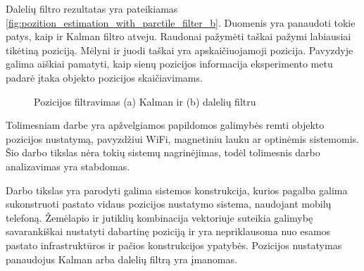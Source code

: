 Dalelių filtro rezultatas yra pateikiamas \ref{fig:pozition_estimation_with_parctile_filter_b}. Duomenis yra panaudoti tokie patys, kaip ir Kalman filtro atveju. Raudonai pažymėti taškai pažymi labiausiai tikėtiną poziciją. Mėlyni ir juodi taškai yra apskaičiuojamoji pozicija. Pavyzdyje galima aiškiai pamatyti, kaip sienų pozicijos informacija eksperimento metu padarė įtaka objekto pozicijos skaičiavimams.

\begin{figure}[H]
    \label{fig:pozition_estimation_with_parctile_filter}
    \centering
    \caption{Pozicijos filtravimas (a) Kalman ir (b) dalelių filtru \cite{willemsenconcept}}
\end{figure}


Tolimesniam darbe yra apžvelgiamos papildomos galimybės remti objekto pozicijos nustatymą, pavyzdžiui WiFi, magnetiniu lauku ar optinėmis sistemomis. Šio darbo tikslas nėra tokių sistemų nagrinėjimas, todėl tolimesnis darbo analizavimas yra stabdomas.

Darbo tikslas yra parodyti galima sistemos konstrukcija, kurios pagalba galima sukonstruoti pastato vidaus pozicijos nustatymo sistema, naudojant mobilų telefoną. Žemėlapio ir jutiklių kombinacija vektoriuje suteikia galimybę savarankiškai nustatyti dabartinę poziciją ir yra nepriklausoma nuo esamos pastato infrastruktūros ir pačios konstrukcijos ypatybės. Pozicijos nustatymas panaudojus Kalman arba dalelių filtrą yra įmanomas.  


